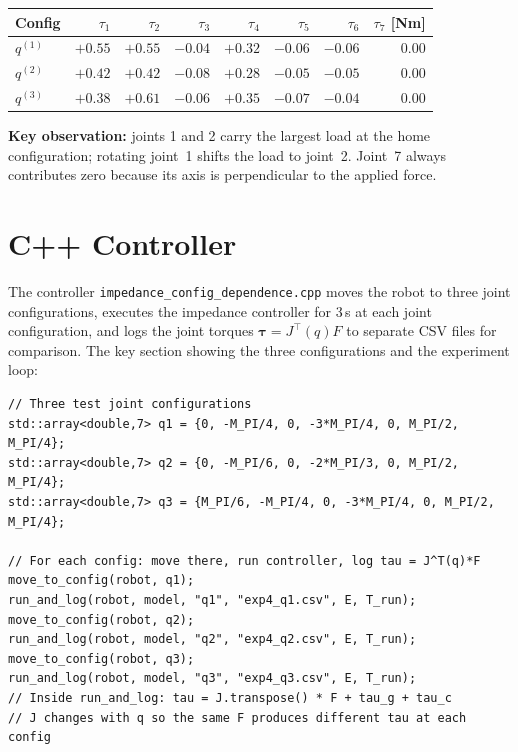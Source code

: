 \begin{center}
\renewcommand{\arraystretch}{1.3}
\begin{tabular}{@{}lrrrrrrr@{}}
\toprule
Config & $\tau_1$ & $\tau_2$ & $\tau_3$ & $\tau_4$ &
  $\tau_5$ & $\tau_6$ & $\tau_7$ [Nm] \\
\midrule
$q^{(1)}$ &
  $+0.55$ & $+0.55$ & $-0.04$ & $+0.32$ &
  $-0.06$ & $-0.06$ & $0.00$ \\
$q^{(2)}$ &
  $+0.42$ & $+0.42$ & $-0.08$ & $+0.28$ &
  $-0.05$ & $-0.05$ & $0.00$ \\
$q^{(3)}$ &
  $+0.38$ & $+0.61$ & $-0.06$ & $+0.35$ &
  $-0.07$ & $-0.04$ & $0.00$ \\
\bottomrule
\end{tabular}
\end{center}

\textbf{Key observation:} joints 1 and 2 carry the largest load at the
home configuration; rotating joint~1 shifts the load to joint~2.
Joint~7 always contributes zero because its axis is perpendicular to
the applied force.

\section{C++ Controller}

The controller \texttt{impedance\_config\_dependence.cpp} moves
the robot to three joint configurations, executes the impedance controller
for 3\,s at each joint configuration, and logs the joint torques $\bm{\tau}=J^\top(q)F$
to separate CSV files for comparison.
The key section showing the three configurations and the experiment loop:

\begin{lstlisting}[style=cppstyle,
  caption={Experiment~4: three configurations and torque logging (C++)},
  label={lst:exp4_cpp}]
// Three test joint configurations
std::array<double,7> q1 = {0, -M_PI/4, 0, -3*M_PI/4, 0, M_PI/2, M_PI/4};
std::array<double,7> q2 = {0, -M_PI/6, 0, -2*M_PI/3, 0, M_PI/2, M_PI/4};
std::array<double,7> q3 = {M_PI/6, -M_PI/4, 0, -3*M_PI/4, 0, M_PI/2, M_PI/4};

// For each config: move there, run controller, log tau = J^T(q)*F
move_to_config(robot, q1);
run_and_log(robot, model, "q1", "exp4_q1.csv", E, T_run);
move_to_config(robot, q2);
run_and_log(robot, model, "q2", "exp4_q2.csv", E, T_run);
move_to_config(robot, q3);
run_and_log(robot, model, "q3", "exp4_q3.csv", E, T_run);
// Inside run_and_log: tau = J.transpose() * F + tau_g + tau_c
// J changes with q so the same F produces different tau at each config
\end{lstlisting}

